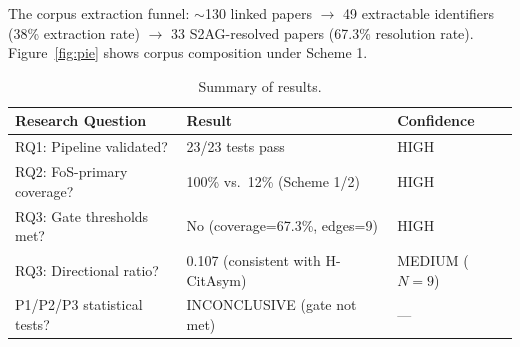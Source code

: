 The corpus extraction funnel: $\sim$130 linked papers $\to$ 49 extractable identifiers (38\% extraction rate) $\to$ 33 S2AG-resolved papers (67.3\% resolution rate).
Figure~\ref{fig:pie} shows corpus composition under Scheme 1.

\begin{table}[h]
\centering
\caption{Summary of results.}
\label{tab:summary}
\begin{tabular}{lll}
\toprule
Research Question & Result & Confidence \\
\midrule
RQ1: Pipeline validated? & 23/23 tests pass & HIGH \\
RQ2: FoS-primary coverage? & 100\% vs.\ 12\% (Scheme 1/2) & HIGH \\
RQ3: Gate thresholds met? & No (coverage=67.3\%, edges=9) & HIGH \\
RQ3: Directional ratio? & 0.107 (consistent with H-CitAsym) & MEDIUM ($N=9$) \\
P1/P2/P3 statistical tests? & INCONCLUSIVE (gate not met) & --- \\
\bottomrule
\end{tabular}
\end{table}
